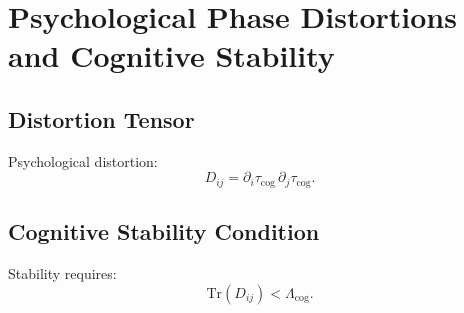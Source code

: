 \chapter{Psychological Phase Distortions and Cognitive Stability}

\section{Distortion Tensor}
Psychological distortion:
\[
D_{ij} = \partial_i \tau_{\mathrm{cog}}\,\partial_j \tau_{\mathrm{cog}}.
\]

\section{Cognitive Stability Condition}
Stability requires:
\[
\mathrm{Tr}(D_{ij}) < \Lambda_{\mathrm{cog}}.
\]

